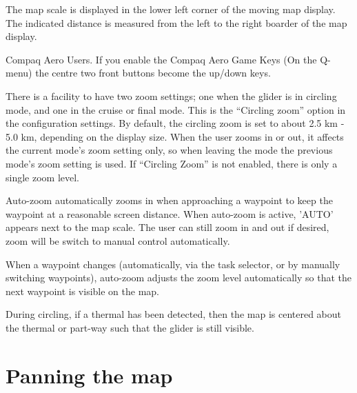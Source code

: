 The map scale is displayed in the lower left corner of the moving map
display. The indicated distance is measured from the left to the right boarder
of the map display.

Compaq Aero Users. If you enable the Compaq Aero Game Keys (On the
Q-menu) the centre two front buttons become the up/down keys.

There is a facility to have two zoom settings; one when the glider is
in circling mode, and one in the cruise or final mode.  This is the ``Circling
zoom'' option in the  configuration settings.  
By default, the circling zoom is set to about 2.5 km - 5.0 km, depending on the
display size. When the user zooms in or out, it affects the current
mode's zoom setting only, so when leaving the mode the previous mode's
zoom setting is used.  If ``Circling Zoom'' is not enabled,
there is only a single zoom level.

Auto-zoom automatically zooms in when approaching a waypoint to keep
the waypoint at a reasonable screen distance. When auto-zoom is active,
'AUTO' appears next to the map scale. The user can still zoom
in and out if desired, zoom will be switch to manual control automatically.

When a waypoint changes (automatically, via the task selector, or by
manually switching waypoints), auto-zoom adjusts the zoom level
automatically so that the next waypoint is visible on the map.

During circling, if a thermal has been detected, then the map is centered about
the thermal or part-way such that the glider is still visible.

\section{Panning the map}\label{sec:panning}

